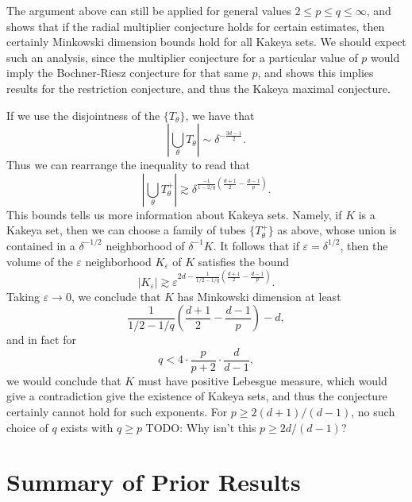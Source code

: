 \begin{remark}
    The argument above can still be applied for general values $2 \leq p \leq q \leq \infty$, and shows that if the radial multiplier conjecture holds for certain estimates, then certainly Minkowski dimension bounds hold for all Kakeya sets. We should expect such an analysis, since the multiplier conjecture for a particular value of $p$ would imply the Bochner-Riesz conjecture for that same $p$, and \cite{Tao} shows this implies results for the restriction conjecture, and thus the Kakeya maximal conjecture.

    If we use the disjointness of the $\{ T_\theta \}$, we have that
    \[ \left| \bigcup_\theta T_\theta \right| \sim \delta^{-\frac{3d-1}{2}}. \]
    Thus we can rearrange the inequality to read that
    \[ \left| \bigcup_\theta T_\theta^+ \right| \gtrsim \delta^{\frac{-1}{1 - 2/q} \left( \frac{d+1}{2} - \frac{d-1}{p} \right)}. \]
    This bounds tells us more information about Kakeya sets. Namely, if $K$ is a Kakeya set, then we can choose a family of tubes $\{ T_\theta^+ \}$ as above, whose union is contained in a $\delta^{-1/2}$ neighborhood of $\delta^{-1} K$. It follows that if $\varepsilon = \delta^{1/2}$, then the volume of the $\varepsilon$ neighborhood $K_\varepsilon$ of $K$ satisfies the bound
    \[ |K_\varepsilon| \gtrsim \varepsilon^{2d - \frac{1}{1/2 - 1/q} \left( \frac{d+1}{2} - \frac{d-1}{p} \right)}. \]
    Taking $\varepsilon \to 0$, we conclude that $K$ has Minkowski dimension at least
    \[ \frac{1}{1/2 - 1/q} \left( \frac{d+1}{2} - \frac{d-1}{p} \right) - d, \]
    and in fact for
    \[ q < 4 \cdot \frac{p}{p+2} \cdot \frac{d}{d-1}, \]
    we would conclude that $K$ must have positive Lebesgue measure, which would give a contradiction give the existence of Kakeya sets, and thus the conjecture certainly cannot hold for such exponents. For $p \geq 2(d+1)/(d-1)$, no such choice of $q$ exists with $q \geq p$ TODO: Why isn't this $p \geq 2d/(d-1)$?
\end{remark}

\section{Summary of Prior Results}

